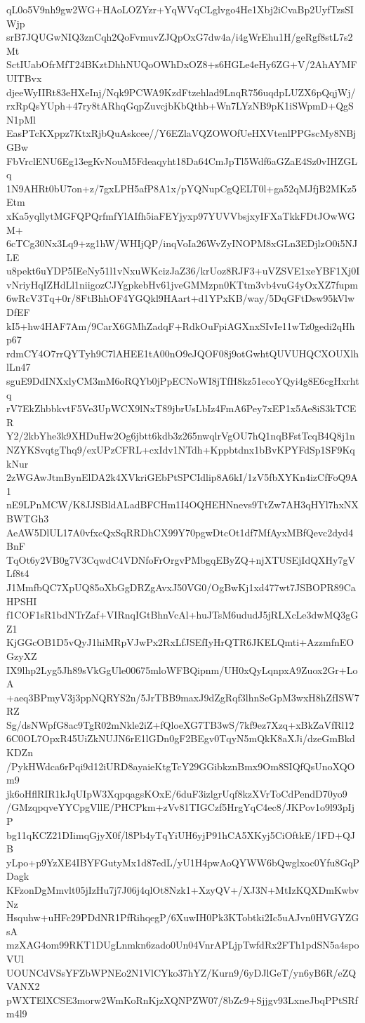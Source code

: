 qL0o5V9nh9gw2WG+HAoLOZYzr+YqWVqCLglvgo4He1Xbj2iCvaBp2UyfTzsSIWjp
srB7JQUGwNIQ3znCqh2QoFvmuvZJQpOxG7dw4a/i4gWrEhu1H/geRgf8stL7s2Mt
SctIUabOfrMfT24BKztDhhNUQoOWhDxOZ8+s6HGLe4eHy6ZG+V/2AhAYMFUITBvx
djeeWyIIRt83eHXeInj/Nqk9PCWA9KzdFtzehlad9LnqR756uqdpLUZX6pQqjWj/
rxRpQsYUph+47ry8tARhqGqpZuvcjbKbQthb+Wn7LYzNB9pK1iSWpmD+QgSN1pMl
EasPTcKXppz7KtxRjbQuAskcee//Y6EZlaVQZOWOfUeHXVtenlPPGscMy8NBjGBw
FbVrclENU6Eg13egKvNouM5Fdeaqyht18Da64CmJpTl5Wdf6aGZaE4Sz0vIHZGLq
1N9AHRt0bU7on+z/7gxLPH5afP8A1x/pYQNupCgQELT0l+ga52qMJfjB2MKz5Etm
xKa5yqllytMGFQPQrfmfYlAIfh5iaFEYjyxp97YUVVbsjxyIFXaTkkFDtJOwWGM+
6cTCg30Nx3Lq9+zg1hW/WHIjQP/inqVoIa26WvZyINOPM8xGLn3EDjlzO0i5NJLE
u8pekt6uYDP5IEeNy51l1vNxuWKcizJaZ36/krUoz8RJF3+uVZSVE1xeYBF1Xj0I
vNriyHqIZHdLl1niigozCJYgpkebHv61jveGMMzpn0KTtm3vb4vuG4yOxXZ7fupm
6wRcV3Tq+0r/8FtBhhOF4YGQkl9HAart+d1YPxKB/way/5DqGFtDsw95kVlwDfEF
kI5+hw4HAF7Am/9CarX6GMhZadqF+RdkOuFpiAGXnxSIvIe11wTz0gedi2qHhp67
rdmCY4O7rrQYTyh9C7lAHEE1tA00nO9eJQOF08j9otGwhtQUVUHQCXOUXlhlLn47
sguE9DdINXxlyCM3mM6oRQYb0jPpECNoWI8jTfH8kz51ecoYQyi4g8E6cgHxrhtq
rV7EkZhbbkvtF5Ve3UpWCX9lNxT89jbrUsLbIz4FmA6Pey7xEP1x5Ae8iS3kTCER
Y2/2kbYhe3k9XHDuHw2Og6jbtt6kdb3z265nwqlrVgOU7hQ1nqBFstTcqB4Q8j1n
NZYKSvqtgThq9/exUPzCFRL+cxIdv1NTdh+Kppbtdnx1bBvKPYFdSp1SF9KqkNur
2zWGAwJtmBynElDA2k4XVkriGEbPtSPCIdlip8A6kI/1zV5fbXYKn4izCfFoQ9A1
nE9LPnMCW/K8JJSBldALadBFCHm1I4OQHEHNnevs9TtZw7AH3qHYl7hxNXBWTGh3
AeAW5DlUL17A0vfxcQxSqRRDhCX99Y70pgwDtcOt1df7MfAyxMBfQevc2dyd4BnF
TqOt6y2VB0g7V3CqwdC4VDNfoFrOrgvPMbgqEByZQ+njXTUSEjIdQXHy7gVLf8t4
J1MmfbQC7XpUQ85oXbGgDRZgAvxJ50VG0/OgBwKj1xd477wt7JSBOPR89CaHPSHI
f1COF1sR1bdNTrZaf+VIRnqIGtBhnVcAl+huJTsM6ududJ5jRLXcLe3dwMQ3gGZ1
KjGGcOB1D5vQyJ1hiMRpVJwPx2RxLfJSEfIyHrQTR6JKELQmti+AzzmfnEOGzyXZ
IX9lhp2Lyg5Jh89sVkGgUle00675mloWFBQipnm/UH0xQyLqnpxA9Zuox2Gr+LoA
+aeq3BPmyV3j3ppNQRYS2n/5JrTBB9maxJ9dZgRqf3lhnSeGpM3wxH8hZfISW7RZ
Sg/dsNWpfG8ac9TgR02mNkle2iZ+fQloeXG7TB3wS/7kf9ez7Xzq+xBkZaVfRl12
6C0OL7OpxR45UiZkNUJN6rE1lGDn0gF2BEgv0TqyN5mQkK8aXJi/dzeGmBkdKDZn
/PykHWdca6rPqi9d12iURD8ayaieKtgTcY29GGibkznBmx9Om8SIQfQsUnoXQOm9
jk6oHflRIR1kJqUIpW3XqpqagsKOxE/6duF3izlgrUqf8kzXVrToCdPendD70yo9
/GMzqpqveYYCpgVllE/PHCPkm+zVv81TIGCzf5HrgYqC4ec8/JKPov1o9l93pIjP
bg11qKCZ21DIimqGjyX0f/l8Pb4yTqYiUH6yjP91hCA5XKyj5CiOftkE/1FD+QJB
yLpo+p9YzXE4IBYFGutyMx1d87edL/yU1H4pwAoQYWW6bQwglxoc0Yfu8GqPDagk
KFzonDgMmvlt05jIzHu7j7J06j4qlOt8Nzk1+XzyQV+/XJ3N+MtIzKQXDmKwbvNz
Hsquhw+uHFc29PDdNR1PfRihqegP/6XuwIH0Pk3KTobtki2Ic5uAJvn0HVGYZGsA
mzXAG4om99RKT1DUgLnmkn6zado0Un04VnrAPLjpTwfdRx2FTh1pdSN5a4spoVUl
UOUNCdVSsYFZbWPNEo2N1VlCYko37hYZ/Kurn9/6yDJlGeT/yn6yB6R/eZQVANX2
pWXTElXCSE3morw2WmKoRnKjzXQNPZW07/8bZc9+Sjjgv93LxneJbqPPtSRfm4l9
